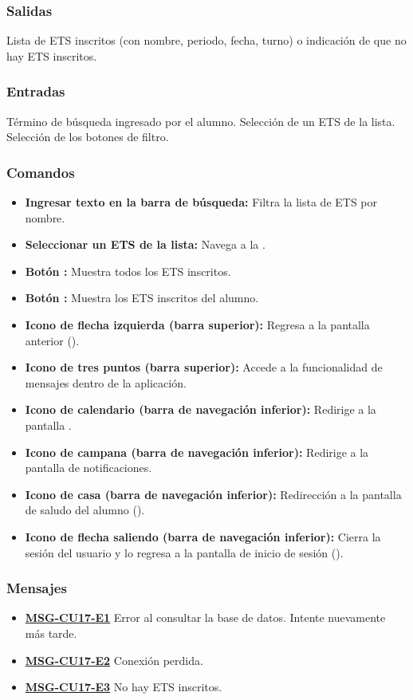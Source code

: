 \subsubsection{Salidas}
Lista de ETS inscritos (con nombre, periodo, fecha, turno) o indicación de que no hay ETS inscritos.

\subsubsection{Entradas}
Término de búsqueda ingresado por el alumno. Selección de un ETS de la lista. Selección de los botones de filtro.

\subsubsection{Comandos}
\begin{itemize}
	\item \textbf{Ingresar texto en la barra de búsqueda:} Filtra la lista de ETS por nombre.
	\item \textbf{Seleccionar un ETS de la lista:} Navega a la .
	\item \textbf{Botón :} Muestra todos los ETS inscritos.
	\item \textbf{Botón :} Muestra los ETS inscritos del alumno.
	\item \textbf{Icono de flecha izquierda (barra superior):} Regresa a la pantalla anterior ().
	\item \textbf{Icono de tres puntos (barra superior):} Accede a la funcionalidad de mensajes dentro de la aplicación.
	\item \textbf{Icono de calendario (barra de navegación inferior):} Redirige a la pantalla .
	\item \textbf{Icono de campana (barra de navegación inferior):} Redirige a la pantalla de notificaciones.
	\item \textbf{Icono de casa (barra de navegación inferior):} Redirección a la pantalla de saludo del alumno ().
	\item \textbf{Icono de flecha saliendo (barra de navegación inferior):} Cierra la sesión del usuario y lo regresa a la pantalla de inicio de sesión ().
\end{itemize}

\subsubsection{Mensajes}
\begin{itemize}
	\item \textbf{\hyperref[msg:CU17-E1]{MSG-CU17-E1}} Error al consultar la base de datos. Intente nuevamente más tarde.
	\item \textbf{\hyperref[msg:CU17-E2]{MSG-CU17-E2}} Conexión perdida.
	\item \textbf{\hyperref[msg:CU17-E3]{MSG-CU17-E3}} No hay ETS inscritos.
\end{itemize}
